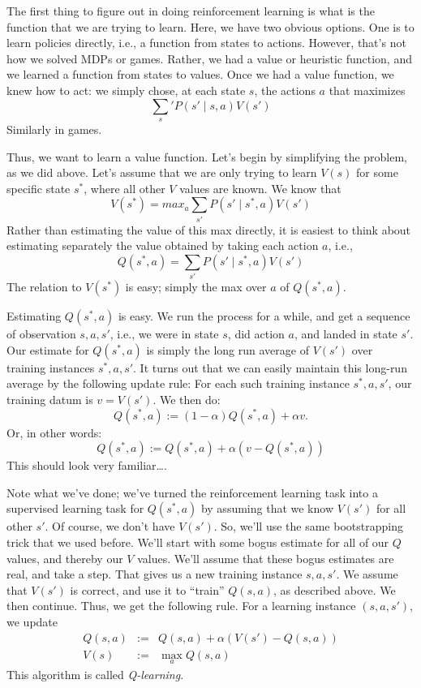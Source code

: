 The first thing to figure out in doing reinforcement learning is what is the
function that we are trying to learn.  Here, we have two obvious options.
One is to learn policies directly, i.e., a function from states to actions.
However, that's not how we solved MDPs or games.  Rather, we had a value or
heuristic function, and we learned a function from states to values.  Once we
had a value function, we knew how to act: we simply chose, at each state $s$,
the actions $a$ that maximizes
\[
 \sum_s' P(s' \mid s,a) V(s')
\]
Similarly in games.

Thus, we want to learn a value function.  Let's begin by simplifying the
problem, as we did above.  Let's assume that we are only trying to learn
$V(s)$ for some specific state $s^*$, where all other $V$ values are known.
We know that 
\[
V(s^*) = max_a \sum_{s'} P(s' \mid s^*,a) V(s')
\]
Rather than estimating the value of this max directly, it is easiest to think
about estimating separately the value obtained by taking each action $a$,
i.e., 
\[
Q(s^*,a) = \sum_{s'} P(s' \mid s^*,a) V(s')
\]
The relation to $V(s^*)$ is easy; simply the max over $a$ of $Q(s^*,a)$. 

Estimating $Q(s^*,a)$ is easy.  We run the process for a while,
and get a sequence of observation $s,a,s'$, i.e., we were in state $s$, did
action $a$, and landed in state $s'$.  Our estimate for $Q(s^*,a)$ is simply
the long run average of $V(s')$ over training instances $s^*,a,s'$.  It turns
out that we can easily maintain this long-run average by the following update
rule:  For each such training instance $s^*,a,s'$, our training datum is $v =
V(s')$.  We then do:
\[
  Q(s^*,a) := (1-\alpha) Q(s^*,a) + \alpha v.
\]
Or, in other words:
\[
  Q(s^*,a) := Q(s^*,a) + \alpha (v - Q(s^*,a))
\]
This should look very familiar\ldots.

Note what we've done; we've turned the reinforcement learning task into a
supervised learning task for $Q(s^*,a)$ by assuming that we know $V(s')$ for
all other $s'$.  Of course, we don't have $V(s')$.  So, we'll use the same 
bootstrapping trick that we used before.  We'll start with some bogus
estimate for all of our $Q$ values, and thereby our $V$ values.  We'll assume
that these bogus estimates are real, and take a step.  That gives us a new
training instance $s,a,s'$.  We assume that $V(s')$ is correct, and use it to
``train'' $Q(s,a)$, as described above.  We then continue.  Thus, we get the
following rule.  For a learning instance $(s,a,s')$, we update
\begin{eqnarray*}
 Q(s,a) & := & Q(s,a) + \alpha (V(s') - Q(s,a)) \\
 V(s)   & := & \max_a Q(s,a)
\end{eqnarray*}
This algorithm is called {\em Q-learning}.

